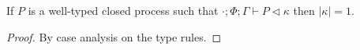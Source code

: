 \begin{lemma}\label{lemma:cpwt}
If $P$ is a well-typed closed process such that $\cdot;\Phi;\Gamma\vdash P \triangleleft \kappa$ then $|\kappa|=1$.
\begin{proof} By case analysis on the type rules.
\end{proof}
\end{lemma}
